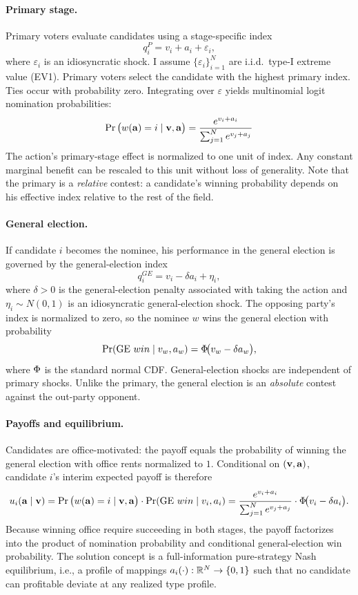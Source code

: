 \paragraph{Primary stage.}
Primary voters evaluate candidates using a stage-specific index
\[
    q_i^{P} = v_i + a_i + \varepsilon_i,
\]
where $\varepsilon_i$ is an idiosyncratic shock. I assume $\{\varepsilon_i\}_{i=1}^N$ are i.i.d.\ type-I extreme value (EV1). Primary voters select the candidate with the highest primary index. Ties occur with probability zero. Integrating over $\varepsilon$ yields multinomial logit nomination probabilities:
\[
    \Pr\big(w\!\left(\mathbf a\right) =i\mid \mathbf v, \mathbf a \big) = \frac{e^{v_i + a_i}}{\sum_{j=1}^N e^{v_j+a_j}}
\]
The action's primary-stage effect is normalized to one unit of index. Any constant marginal benefit can be rescaled to this unit without loss of generality. Note that the primary is a \emph{relative} contest: a candidate's winning probability depends on his effective index relative to the rest of the field.

\paragraph*{General election.}
If candidate $i$ becomes the nominee, his performance in the general election is governed by the general-election index
\[
    q_i^{GE} = v_i - \delta a_i + \eta_i,
\]
where $\delta > 0$ is the general-election penalty associated with taking the action and $\eta_i\sim N(0,1)$ is an idiosyncratic general-election shock. The opposing party's index is normalized to zero, so the nominee $w$ wins the general election with probability
\[
    \Pr(\text{GE}\ win \mid v_w, a_w) =\Phi\!\big(v_w-\delta a_w\big),
\]
where $\Phi$ is the standard normal CDF. General-election shocks are independent of primary shocks. Unlike the primary, the general election is an \emph{absolute} contest against the out-party opponent.

\paragraph{Payoffs and equilibrium.}
Candidates are office-motivated: the payoff equals the probability of winning the general election with office rents normalized to $1$. Conditional on $(\mathbf v, \mathbf a)$, candidate $i$'s interim expected payoff is therefore
\[
    u_i(\mathbf a\mid\mathbf v) = \Pr\big(w\!\left(\mathbf a\right) =i\mid \mathbf v, \mathbf a \big) \cdot \Pr(\text{GE}\ win \mid v_i, a_i) = \frac{e^{v_i + a_i}}{\sum_{j=1}^N e^{v_j+a_j}}\cdot \Phi\!\big(v_i-\delta a_i\big).
\]
Because winning office require succeeding in both stages, the payoff factorizes into the product of nomination probability and conditional general-election win probability. The solution concept is a full-information pure-strategy Nash equilibrium, i.e., a profile of mappings $a_i(\cdot): \mathbb{R}^N\to\{0,1\}$ such that no candidate can profitable deviate at any realized type profile.
